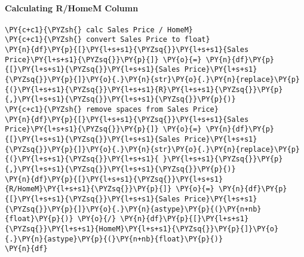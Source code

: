     \hypertarget{calculating-rhomem-column}{%
\paragraph{Calculating R/HomeM Column}\label{calculating-rhomem-column}}

    \begin{tcolorbox}[breakable, size=fbox, boxrule=1pt, pad at break*=1mm,colback=cellbackground, colframe=cellborder]
\begin{Verbatim}[commandchars=\\\{\}]
\PY{c+c1}{\PYZsh{} calc Sales Price / HomeM}
\PY{c+c1}{\PYZsh{} convert Sales Price to float}
\PY{n}{df}\PY{p}{[}\PY{l+s+s1}{\PYZsq{}}\PY{l+s+s1}{Sales Price}\PY{l+s+s1}{\PYZsq{}}\PY{p}{]} \PY{o}{=} \PY{n}{df}\PY{p}{[}\PY{l+s+s1}{\PYZsq{}}\PY{l+s+s1}{Sales Price}\PY{l+s+s1}{\PYZsq{}}\PY{p}{]}\PY{o}{.}\PY{n}{str}\PY{o}{.}\PY{n}{replace}\PY{p}{(}\PY{l+s+s1}{\PYZsq{}}\PY{l+s+s1}{R}\PY{l+s+s1}{\PYZsq{}}\PY{p}{,}\PY{l+s+s1}{\PYZsq{}}\PY{l+s+s1}{\PYZsq{}}\PY{p}{)}
\PY{c+c1}{\PYZsh{} remove spaces from Sales Price}
\PY{n}{df}\PY{p}{[}\PY{l+s+s1}{\PYZsq{}}\PY{l+s+s1}{Sales Price}\PY{l+s+s1}{\PYZsq{}}\PY{p}{]} \PY{o}{=} \PY{n}{df}\PY{p}{[}\PY{l+s+s1}{\PYZsq{}}\PY{l+s+s1}{Sales Price}\PY{l+s+s1}{\PYZsq{}}\PY{p}{]}\PY{o}{.}\PY{n}{str}\PY{o}{.}\PY{n}{replace}\PY{p}{(}\PY{l+s+s1}{\PYZsq{}}\PY{l+s+s1}{ }\PY{l+s+s1}{\PYZsq{}}\PY{p}{,}\PY{l+s+s1}{\PYZsq{}}\PY{l+s+s1}{\PYZsq{}}\PY{p}{)}
\PY{n}{df}\PY{p}{[}\PY{l+s+s1}{\PYZsq{}}\PY{l+s+s1}{R/HomeM}\PY{l+s+s1}{\PYZsq{}}\PY{p}{]} \PY{o}{=} \PY{n}{df}\PY{p}{[}\PY{l+s+s1}{\PYZsq{}}\PY{l+s+s1}{Sales Price}\PY{l+s+s1}{\PYZsq{}}\PY{p}{]}\PY{o}{.}\PY{n}{astype}\PY{p}{(}\PY{n+nb}{float}\PY{p}{)} \PY{o}{/} \PY{n}{df}\PY{p}{[}\PY{l+s+s1}{\PYZsq{}}\PY{l+s+s1}{HomeM}\PY{l+s+s1}{\PYZsq{}}\PY{p}{]}\PY{o}{.}\PY{n}{astype}\PY{p}{(}\PY{n+nb}{float}\PY{p}{)}
\PY{n}{df}
\end{Verbatim}
\end{tcolorbox}

